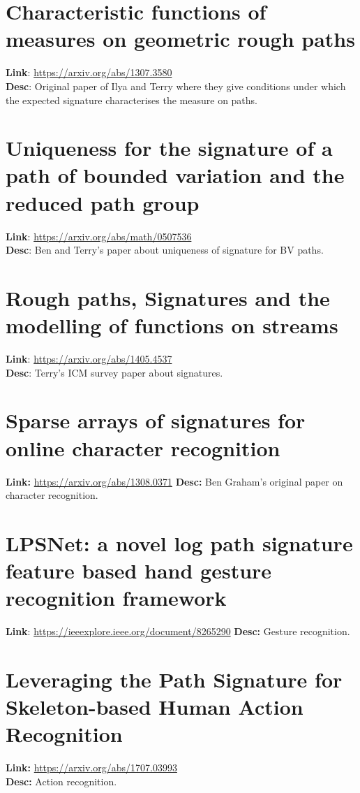 \documentclass[10pt,a4paper]{article}
\begin{document}
\section{Characteristic functions of measures on geometric rough paths}
\textbf{Link}: \url{https://arxiv.org/abs/1307.3580}\\
\textbf{Desc}: Original paper of Ilya and Terry where they give conditions under which the expected signature characterises the measure on paths.

\section{Uniqueness for the signature of a path of bounded variation and the reduced path group}
\textbf{Link}: \url{https://arxiv.org/abs/math/0507536}\\
\textbf{Desc}: Ben and Terry's paper about uniqueness of signature for BV paths.

\section{Rough paths, Signatures and the modelling of functions on streams}
\textbf{Link}: \url{https://arxiv.org/abs/1405.4537}\\
\textbf{Desc}: Terry's ICM survey paper about signatures.

\section{Sparse arrays of signatures for online character recognition}
\textbf{Link:} \url{https://arxiv.org/abs/1308.0371}
\textbf{Desc:} Ben Graham's original paper on character recognition.

\section{LPSNet: a novel log path signature feature based hand gesture recognition framework}

\textbf{Link}: \url{https://ieeexplore.ieee.org/document/8265290}
\textbf{Desc:} Gesture recognition.

\section{Leveraging the Path Signature for Skeleton-based Human Action Recognition}

\textbf{Link:} \url{https://arxiv.org/abs/1707.03993} \\
\textbf{Desc:} Action recognition.
\end{document}
